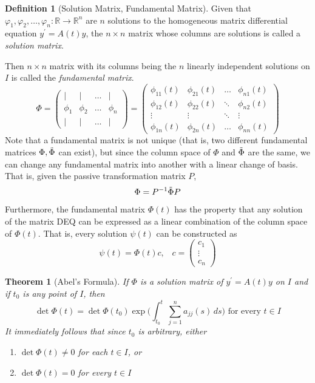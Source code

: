 \documentclass{article}
\newtheorem{theorem}{Theorem}[section]
\theoremstyle{remark}
\theoremstyle{definition}
\newtheorem{definition}{Definition}[section]
\begin{document}
      \begin{definition}[Solution Matrix, Fundamental Matrix]
      Given that $\varphi_1, \varphi_2, \ldots, \varphi_n: \mathbb{R} \longrightarrow \mathbb{R}^n$ are $n$ solutions to the homogeneous matrix differential equation $y^\prime = A(t) y$, the $n \times n$ matrix whose columns are solutions is called a \textit{solution matrix}.

      Then $n \times n$ matrix with its columns being the $n$ linearly independent solutions on $I$ is called the \textit{fundamental matrix}. 
      \[\Phi = \begin{pmatrix}
      | & | & \ldots & | \\
      \phi_1 & \phi_2 & \ldots & \phi_n \\
      | & | & \ldots & |
      \end{pmatrix} = \begin{pmatrix}
      \phi_{11}(t) & \phi_{21} (t) & \ldots & \phi_{n1} (t) \\
      \phi_{12} (t) & \phi_{22} (t) & \ddots & \phi_{n2} (t) \\
      \vdots & \vdots & \ddots & \vdots \\
      \phi_{1n} (t) & \phi_{2n} (t) & \ldots & \phi_{nn} (t)
      \end{pmatrix}\]
      Note that a fundamental matrix is not unique (that is, two different fundamental matrices $\Phi, \Tilde{\Phi}$ can exist), but since the column space of $\Phi$ and $\Tilde{\Phi}$ are the same, we can change any fundamental matrix into another with a linear change of basis. That is, given the passive transformation matrix $P$, 
      \[\Phi = P^{-1} \Tilde{\Phi} P\]
      Furthermore, the fundamental matrix $\Phi (t)$ has the property that any solution of the matrix DEQ can be expressed as a linear combination of the column space of $\Phi(t)$. That is, every solution $\psi (t)$ can be constructed as
      \[\psi (t) = \Phi (t) c, \;\;\; c = \begin{pmatrix} 
      c_1 \\ \vdots \\ c_n \end{pmatrix} \]
      \end{definition}

      \begin{theorem}[Abel's Formula]
      If $\Phi$ is a solution matrix of $y^\prime = A(t) y$ on $I$ and if $t_0$ is any point of $I$, then 
      \[\det{\Phi(t)} = \det{\Phi(t_0)} \exp\bigg( \int_{t_0}^t \sum_{j=1}^n a_{jj} (s) \, ds\bigg) \text{ for every } t \in I\]
      It immediately follows that since $t_0$ is arbitrary, either 
      \begin{enumerate}
          \item $\det{\Phi(t)} \neq 0$ for each $t \in I$, or 
          \item $\det{\Phi(t)} = 0$ for every $t \in I$ 
      \end{enumerate}
      \end{theorem}
\end{document}
